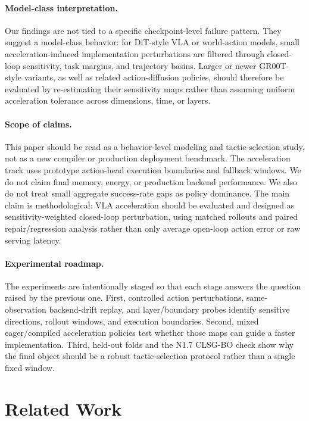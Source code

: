 \documentclass[10pt]{article}
\begin{document}
\paragraph{Model-class interpretation.}
Our findings are not tied to a specific checkpoint-level failure pattern. They suggest a model-class behavior: for DiT-style VLA or world-action models, small acceleration-induced implementation perturbations are filtered through closed-loop sensitivity, task margins, and trajectory basins. Larger or newer GR00T-style variants, as well as related action-diffusion policies, should therefore be evaluated by re-estimating their sensitivity maps rather than assuming uniform acceleration tolerance across dimensions, time, or layers.

\paragraph{Scope of claims.}
This paper should be read as a behavior-level modeling and tactic-selection study, not as a new compiler or production deployment benchmark. The acceleration track uses prototype action-head execution boundaries and fallback windows. We do not claim final memory, energy, or production backend performance. We also do not treat small aggregate success-rate gaps as policy dominance. The main claim is methodological: VLA acceleration should be evaluated and designed as sensitivity-weighted closed-loop perturbation, using matched rollouts and paired repair/regression analysis rather than only average open-loop action error or raw serving latency.

\paragraph{Experimental roadmap.}
The experiments are intentionally staged so that each stage answers the question raised by the previous one. First, controlled action perturbations, same-observation backend-drift replay, and layer/boundary probes identify sensitive directions, rollout windows, and execution boundaries. Second, mixed eager/compiled acceleration policies test whether those maps can guide a faster implementation. Third, held-out folds and the N1.7 CLSG-BO check show why the final object should be a robust tactic-selection protocol rather than a single fixed window.

\section{Related Work}
\end{document}
